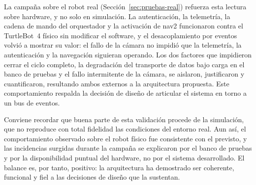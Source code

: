 La campaña sobre el robot real (Sección~\ref{sec:pruebas-real}) refuerza esta lectura sobre
hardware, y no solo en simulación. La autenticación, la telemetría, la cadena de mando del
orquestador y la activación de \gls{nav2} funcionaron contra el \mbox{TurtleBot~4} físico sin
modificar el software, y el desacoplamiento por eventos volvió a mostrar su valor: el fallo de la
cámara no impidió que la telemetría, la autenticación y la navegación siguieran operando. Los dos
factores que impidieron cerrar el ciclo completo, la degradación del transporte de datos bajo
carga en el banco de pruebas y el fallo intermitente de la cámara, se aislaron, justificaron y cuantificaron, 
resultando ambos externos a la arquitectura propuesta. Este comportamiento
respalda la decisión de diseño de articular el sistema en torno a un bus de eventos.

Conviene recordar que buena parte de esta validación procede de la simulación, que no reproduce
con total fidelidad las condiciones del entorno real. Aun así, el comportamiento observado sobre
el robot físico fue consistente con el previsto, y las incidencias surgidas durante la campaña se
explicaron por el banco de pruebas y por la disponibilidad puntual del hardware, no por el sistema
desarrollado. El balance es, por tanto, positivo: la arquitectura ha demostrado ser coherente,
funcional y fiel a las decisiones de diseño que la sustentan.

